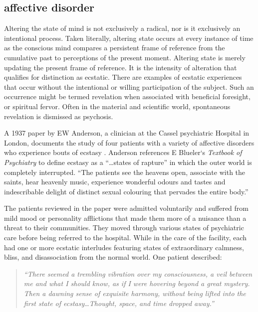 \documentclass{UIdahoMastersThesis}
\begin{document}
\subsection{affective disorder}

Altering the state of mind is not exclusively a radical, nor is it exclusively an intentional process. Taken literally, altering state occurs at every instance of time as the conscious mind compares a persistent frame of reference from the cumulative past to perceptions of the present moment. Altering state is merely updating the present frame of reference. It is the intensity of alteration that qualifies for distinction as ecstatic. There are examples of ecstatic experiences that occur without the intentional or willing participation of the subject. Such an occurrence might be termed revelation when associated with beneficial foresight, or spiritual fervor. Often in the material and scientific world, spontaneous revelation is dismissed as psychosis.

A 1937 paper by EW Anderson, a clinician at the Cassel psychiatric Hospital in London, documents the study of four patients with a variety of affective disorders who experience bouts of ecstasy \cite{anderson_clinical_1938}. Anderson references E Blueler`s \emph{Textbook of Psychiatry} to define ecstasy as a ``\ldots states of rapture'' in which the outer world is completely interrupted. ``The patients see the heavens open, associate with the saints, hear heavenly music, experience wonderful odours and tastes and indescribable delight of distinct sexual colouring that pervades the entire body.'' 

The patients reviewed in the paper were admitted voluntarily and suffered from mild mood or personality afflictions that made them more of a nuisance than a threat to their communities. They moved through various states of psychiatric care before being referred to the hospital. While in the care of the facility, each had one or more ecstatic interludes featuring states of extraordinary calmness, bliss, and disassociation from the normal world. One patient described:

\begin{quote}
\textit{``There seemed a trembling vibration over my consciousness, a veil between me and what I should know, as if I were hovering beyond a great mystery. Then a dawning sense of exquisite harmony, without being lifted into the first state of ecstasy\ldots Thought, space, and time dropped away.''}
\end{quote}
  
\end{document}
